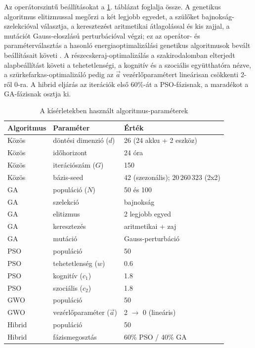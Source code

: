 Az operátorszintű beállításokat a \ref{tab:parameters}. táblázat foglalja össze. A genetikus algoritmus elitizmussal megőrzi a két legjobb egyedet, a szülőket bajnokság-szelekcióval választja, a keresztezést aritmetikai átlagolással és kis zajjal, a mutációt Gauss-eloszlású perturbációval végzi; ez az operátor- és paraméterválasztás a hasonló energiaoptimalizálási genetikus algoritmusok bevált beállításait követi \cite{Ismail2014}. A részecskeraj-optimalizálás a szakirodalomban elterjedt alapbeállítást követi a tehetetlenségi, a kognitív és a szociális együtthatóra nézve, a szürkefarkas-optimalizáló pedig az $\vec{a}$ vezérlőparamétert lineárisan csökkenti 2-ről 0-ra. A hibrid eljárás az iterációk első 60\%-át a PSO-fázisnak, a maradékot a GA-fázisnak osztja ki.

\begin{table}[H]
\centering
\caption{A kísérletekben használt algoritmus-paraméterek}
\label{tab:parameters}
\begin{tabular}{lll}
\toprule
Algoritmus & Paraméter & Érték \\
\midrule
Közös & döntési dimenzió ($d$) & 26 (24 akku + 2 eszköz) \\
Közös & időhorizont & 24 óra \\
Közös & iterációszám ($G$) & 150 \\
Közös & bázis-seed & 42 (szezonális); $20\,260\,323$ (2x2) \\
\midrule
GA & populáció ($N$) & 50 és 100 \\
GA & szelekció & bajnokság \\
GA & elitizmus & 2 legjobb egyed \\
GA & keresztezés & aritmetikai + zaj \\
GA & mutáció & Gauss-perturbáció \\
\midrule
PSO & populáció & 50 \\
PSO & tehetetlenség ($w$) & 0.6 \\
PSO & kognitív ($c_1$) & 1.8 \\
PSO & szociális ($c_2$) & 1.8 \\
\midrule
GWO & populáció & 50 \\
GWO & vezérlőparaméter ($\vec{a}$) & 2 $\rightarrow$ 0 (lineáris) \\
\midrule
Hibrid & populáció & 50 \\
Hibrid & fázismegosztás & 60\% PSO / 40\% GA \\
\bottomrule
\end{tabular}
\end{table}

